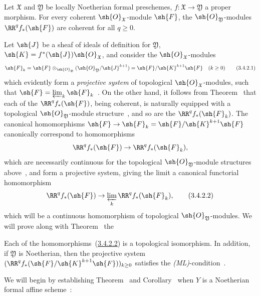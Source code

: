\begin{theorem}[3.4.2]
\label{III.3.4.2}
Let $\mathfrak{X}$ and $\mathfrak{Y}$ be locally Noetherian formal preschemes, $f:\mathfrak{X}\to\mathfrak{Y}$ a proper morphism.
For every coherent $\sh{O}_\mathfrak{X}$-module $\sh{F}$, the $\sh{O}_\mathfrak{Y}$-modules $\RR^q f_*(\sh{F})$ are coherent for all $q\geq 0$.
\end{theorem}

Let $\sh{J}$ be a sheaf of ideals of definition for $\mathfrak{Y}$, $\sh{K}=f^*(\sh{J})\sh{O}_\mathfrak{X}$, and consider the $\sh{O}_\mathfrak{X}$-modules
\[
\label{III.3.4.2.1}
  \sh{F}_k=\sh{F}\otimes_{\sh{O}_\mathfrak{Y}}(\sh{O}_\mathfrak{Y}/\sh{J}^{k+1})=\sh{F}/\sh{K}^{k+1}\sh{F}\quad(k\geq 0)
  \tag{3.4.2.1}
\]
which evidently form a \emph{projective system} of topological $\sh{O}_\mathfrak{X}$-modules, such that
$\sh{F}=\varprojlim_k\sh{F}_k$~.
On the other hand, it follows from Theorem~ that each of the $\RR^q f_*(\sh{F})$, being coherent, is naturally equipped with a topological $\sh{O}_\mathfrak{Y}$-module structure~, and so are the $\RR^q f_*(\sh{F}_k)$.
The canonical homomorphisms $\sh{F}\to\sh{F}_k=\sh{F}/\sh{K}^{k+1}\sh{F}$ canonically correspond to homomorphisms
\[
  \RR^q f_*(\sh{F})\to\RR^q f_*(\sh{F}_k),
\]
which are necessarily continuous for the topological $\sh{O}_\mathfrak{Y}$-module structures above~, and form a projective system, giving the limit a canonical functorial homomorphism
\[
\label{III.3.4.2.2}
  \RR^q f_*(\sh{F})\to\varprojlim_k\RR^q f_*(\sh{F}_k),
  \tag{3.4.2.2}
\]
which will be a continuous homomorphism of topological $\sh{O}_\mathfrak{Y}$-modules.
We will prove along with Theorem~ the
\begin{corollary}[3.4.3]
\label{III.3.4.3}
Each of the homomorphisms~(\hyperref[III.3.4.2.2]{3.4.2.2}) is a topological isomorphism.
In addition, if $\mathfrak{Y}$ is Noetherian, then the projective system $(\RR^q f_*(\sh{F}/\sh{K}^{k+1}\sh{F}))_{k\geq 0}$ satisfies the \emph{(ML)}-condition~.
\end{corollary}
We will begin by establishing Theorem~ and Corollary~ when $Y$ is a Noetherian formal affine scheme~:
